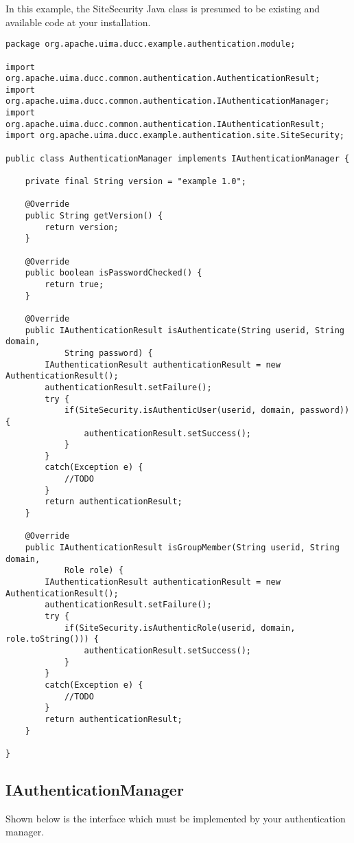     In this example, the SiteSecurity Java class is presumed to be existing
    and available code at your installation.
    
    \begin{verbatim}
package org.apache.uima.ducc.example.authentication.module;

import org.apache.uima.ducc.common.authentication.AuthenticationResult;
import org.apache.uima.ducc.common.authentication.IAuthenticationManager;
import org.apache.uima.ducc.common.authentication.IAuthenticationResult;
import org.apache.uima.ducc.example.authentication.site.SiteSecurity;

public class AuthenticationManager implements IAuthenticationManager {

    private final String version = "example 1.0";
    
    @Override
    public String getVersion() {
        return version;
    }

    @Override
    public boolean isPasswordChecked() {
        return true;
    }

    @Override
    public IAuthenticationResult isAuthenticate(String userid, String domain,
            String password) {
        IAuthenticationResult authenticationResult = new AuthenticationResult();
        authenticationResult.setFailure();
        try {
            if(SiteSecurity.isAuthenticUser(userid, domain, password)) {
                authenticationResult.setSuccess();
            }
        }
        catch(Exception e) {
            //TODO
        }
        return authenticationResult;
    }

    @Override
    public IAuthenticationResult isGroupMember(String userid, String domain,
            Role role) {
        IAuthenticationResult authenticationResult = new AuthenticationResult();
        authenticationResult.setFailure();
        try {
            if(SiteSecurity.isAuthenticRole(userid, domain, role.toString())) {
                authenticationResult.setSuccess();
            }
        }
        catch(Exception e) {
            //TODO
        }
        return authenticationResult;
    }

}
    \end{verbatim}
        
\subsection{IAuthenticationManager}
       
    Shown below is the interface which must be implemented by your
    authentication manager.
    
